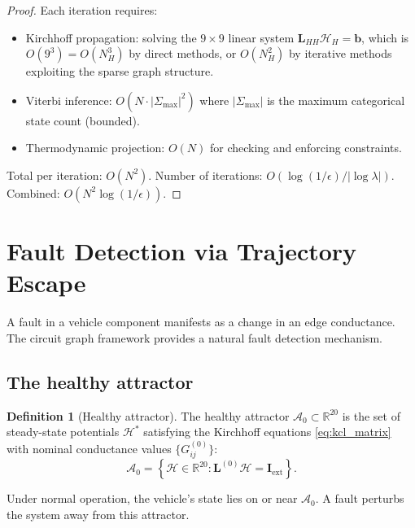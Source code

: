 \documentclass[twocolumn,10pt,a4paper]{article}
\theoremstyle{definition}
\newtheorem{definition}[theorem]{Definition}
\theoremstyle{remark}
\newcommand{\R}{\mathbb{R}}
\newcommand{\Hcal}{\mathcal{H}}
\newcommand{\vect}[1]{\boldsymbol{#1}}
\newcommand{\mat}[1]{\mathbf{#1}}
\begin{document}
\begin{proof}
Each iteration requires:
\begin{itemize}
    \item Kirchhoff propagation: solving the $9 \times 9$ linear system $\mat{L}_{HH} \vect{\Hcal}_H = \vect{b}$, which is $O(9^3) = O(N_H^3)$ by direct methods, or $O(N_H^2)$ by iterative methods exploiting the sparse graph structure.
    \item Viterbi inference: $O(N \cdot |\Sigma_{\max}|^2)$ where $|\Sigma_{\max}|$ is the maximum categorical state count (bounded).
    \item Thermodynamic projection: $O(N)$ for checking and enforcing constraints.
\end{itemize}
Total per iteration: $O(N^2)$. Number of iterations: $O(\log(1/\epsilon)/|\log\lambda|)$. Combined: $O(N^2 \log(1/\epsilon))$.
\end{proof}




\section{Fault Detection via Trajectory Escape}\label{sec:fault}

A fault in a vehicle component manifests as a change in an edge conductance. The circuit graph framework provides a natural fault detection mechanism.

\subsection{The healthy attractor}

\begin{definition}[Healthy attractor]\label{def:healthy_attractor}
The healthy attractor $\mathcal{A}_0 \subset \R^{20}$ is the set of steady-state potentials $\vect{\Hcal}^*$ satisfying the Kirchhoff equations \eqref{eq:kcl_matrix} with nominal conductance values $\{G_{ij}^{(0)}\}$:
\begin{equation}\label{eq:healthy_attractor}
    \mathcal{A}_0 = \left\{ \vect{\Hcal} \in \R^{20} : \mat{L}^{(0)} \vect{\Hcal} = \vect{I}_{\mathrm{ext}} \right\}.
\end{equation}
\end{definition}

Under normal operation, the vehicle's state lies on or near $\mathcal{A}_0$. A fault perturbs the system away from this attractor.
\end{document}
